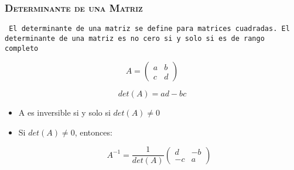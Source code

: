\documentclass[16.5pt]{beamer}
\begin{document}


{
\begin{frame}
\frametitle{\textsc{\textbf{Determinante de una Matriz}}}
\hspace*{-5mm}
\vspace*{-5mm} 
\vspace{0.3cm}



\texttt{  {\color{blue} El determinante de una matriz se define para matrices cuadradas. El determinante de una matriz es no cero si y solo si es de rango completo}}


$$ A= \begin{pmatrix} a & b \\ c & d \end{pmatrix}$$

$$det(A) = ad-bc$$

\begin{itemize}
\item A es inversible si y solo si $det(A) \neq 0$
\item Si $det(A) \neq  0$, entonces:

$$ A^{-1} = \frac{1}{det(A)}\begin{pmatrix} d & -b \\ -c & a   \end{pmatrix}$$

\end{itemize}

\end{frame}
}

\end{document}
